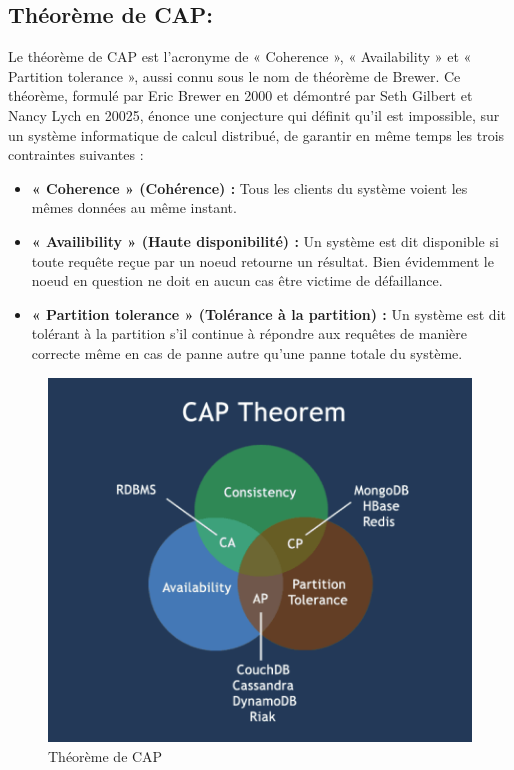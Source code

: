 \subsection{Théorème de CAP: }
Le théorème de CAP est l’acronyme de « Coherence », « Availability » et « Partition tolerance », aussi connu sous le nom de théorème de Brewer. Ce théorème, formulé par Eric Brewer en 2000 et démontré par Seth Gilbert et Nancy Lych en 20025, énonce une conjecture qui définit qu’il est impossible, sur un système informatique de calcul distribué, de garantir en même temps les trois contraintes suivantes :

\begin{itemize}[label=\textbullet]
\item \textbf{« Coherence » (Cohérence) :} Tous les clients du système voient les mêmes données au même instant.
\item \textbf{« Availibility » (Haute disponibilité) :} Un système est dit disponible si toute requête reçue par un noeud retourne un résultat. Bien évidemment le noeud en question ne doit en aucun cas être victime de défaillance.
\item \textbf{« Partition tolerance » (Tolérance à la partition) :} Un système est dit tolérant à la partition s’il continue à répondre aux requêtes de manière correcte même en cas de panne autre qu’une panne totale du système.
\end{itemize}

\begin{figure}[h]
	\centering
    \includegraphics[scale=0.5]{img/part1/4.1}
    \caption{Théorème de CAP}
\end{figure}

